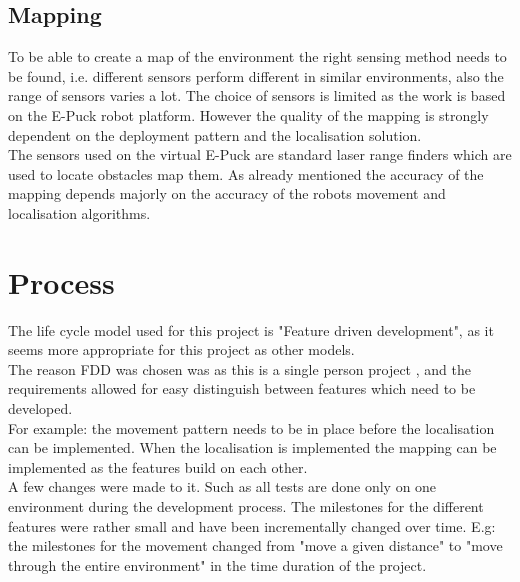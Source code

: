 \subsection{Mapping}
To be able to create a map of the environment the right sensing method needs to be found, i.e. different sensors perform different in similar environments, also the range of sensors varies a lot. 
The choice of sensors is limited as the work is based on the E-Puck robot platform.
However the quality of the mapping is strongly dependent on the deployment pattern and the localisation solution.\\

The sensors used on the virtual E-Puck are standard laser range finders which are used to locate obstacles map them. As already mentioned the accuracy of the mapping depends majorly on the accuracy of the robots movement and localisation algorithms. 

\section{Process}
The life cycle model used for this project is "Feature driven development", as it seems more appropriate for this project as other models. \\
The reason FDD was chosen was as this is a single person project , and the requirements allowed for easy distinguish between features which need to be developed. \\
For example: the movement pattern needs to be in place before the localisation can be implemented. When the localisation is implemented the mapping can be implemented as the features build on each other. \\

A few changes were made to it. Such as all tests are done only on one environment during the development process. The milestones for the different features were rather small and have been incrementally changed over time. E.g: the milestones for the movement changed from "move a given distance" to "move through the entire environment" in the time duration of the project.


